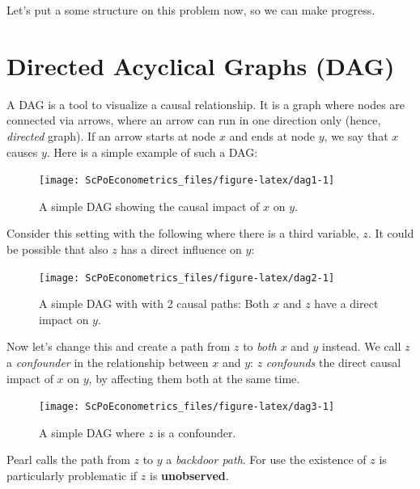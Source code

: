 \documentclass[]{book}
\begin{document}
Let's put a some structure on this problem now, so we can make progress.

\section{Directed Acyclical Graphs (DAG)}\label{dags}

A DAG is a tool to visualize a causal relationship. It is a graph where
nodes are connected via arrows, where an arrow can run in one direction
only (hence, \emph{directed} graph). If an arrow starts at node \(x\)
and ends at node \(y\), we say that \(x\) causes \(y\). Here is a simple
example of such a DAG:

\begin{figure}

{\centering \texttt{[image: ScPoEconometrics\_files/figure-latex/dag1-1]} 

}

\caption{A simple DAG showing the causal impact of $x$ on $y$.}\label{fig:dag1}
\end{figure}

Consider this setting with the following where there is a third
variable, \(z\). It could be possible that also \(z\) has a direct
influence on \(y\):

\begin{figure}

{\centering \texttt{[image: ScPoEconometrics\_files/figure-latex/dag2-1]} 

}

\caption{A simple DAG with with 2 causal paths: Both $x$ and $z$ have a direct impact on $y$.}\label{fig:dag2}
\end{figure}

Now let's change this and create a path from \(z\) to \emph{both} \(x\)
and \(y\) instead. We call \(z\) a \emph{confounder} in the relationship
between \(x\) and \(y\): \(z\) \emph{confounds} the direct causal impact
of \(x\) on \(y\), by affecting them both at the same time.

\begin{figure}

{\centering \texttt{[image: ScPoEconometrics\_files/figure-latex/dag3-1]} 

}

\caption{A simple DAG where $z$ is a confounder.}\label{fig:dag3}
\end{figure}

Pearl calls the path from \(z\) to \(y\) a \emph{backdoor path}. For use
the existence of \(z\) is particularly problematic if \(z\) is
\textbf{unobserved}.
\end{document}
